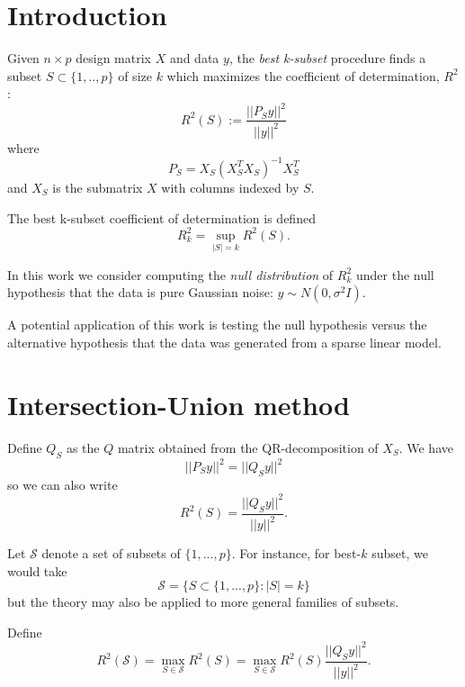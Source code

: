 \documentclass[12pt]{article}
\begin{document}
\maketitle

\newcommand{\tr}{\text{tr}}
\newcommand{\E}{\textbf{E}}
\newcommand{\diag}{\text{diag}}
\newcommand{\argmax}{\text{argmax}}
\newcommand{\Cov}{\text{Cov}}
\newcommand{\Var}{\text{Var}}
\newcommand{\argmin}{\text{argmin}}
\newcommand{\Vol}{\text{Vol}}
\newcommand{\comm}[1]{}

\newcommand{\bx}{\boldsymbol{x}}
\newcommand{\by}{\boldsymbol{y}}
\newcommand{\bX}{\boldsymbol{X}}
\newcommand{\bY}{\boldsymbol{Y}}


\section{Introduction}

Given $n \times p$ design matrix $X$ and data $y$, the \emph{best
k-subset} procedure finds a subset $S \subset \{1,..,p\}$ of size $k$
which maximizes the coefficient of determination, $R^2$:
\[
R^2(S) := \frac{||P_S y||^2}{||y||^2}
\]
where
\[
P_S = X_S (X_S^T X_S)^{-1} X_S^T
\]
and $X_S$ is the submatrix $X$ with columns indexed by $S$.

The best k-subset coefficient of determination is defined
\[
R^2_k = \sup_{|S| = k} R^2(S).
\]

In this work we consider computing the \emph{null distribution} of
$R^2_k$ under the null hypothesis that the data is pure Gaussian
noise: $y \sim N(0, \sigma^2 I)$.

A potential application of this work is testing the null hypothesis
versus the alternative hypothesis that the data was generated from a
sparse linear model.

\section{Intersection-Union method}

Define $Q_S$ as the $Q$ matrix obtained from the QR-decomposition of
$X_S$.  We have
\[
||P_S y||^2 = ||Q_S y||^2
\]
so we can also write
\[
R^2(S) = \frac{||Q_S y||^2}{||y||^2}.
\]

Let $\mathcal{S}$ denote a set of subsets of $\{1,...,p\}$.  For instance, for best-$k$ subset, we would take
\[
\mathcal{S} = \{S \subset \{1,...,p\}: |S| = k\}
\]
but the theory may also be applied to more general families of
subsets.

Define
\[
R^2(\mathcal{S}) = \max_{S \in \mathcal{S}} R^2(S) = \max_{S \in \mathcal{S}} R^2(S) \frac{||Q_S y||^2}{||y||^2}.
\]
\end{document}
